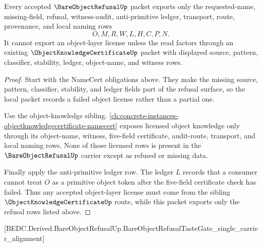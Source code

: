 \begin{theorem}
\label{thm:bare-object-refusal-object-license-nonescape}
Every accepted $\BareObjectRefusalUp$ packet exports only the requested-name, missing-field, refusal, witness-audit, anti-primitive ledger, transport, route, provenance, and local naming rows
$$
O,M,R,W,L,H,C,P,N.
$$
It cannot export an object-layer license unless the read factors through an existing $\ObjectKnowledgeCertificateUp$ packet with displayed source, pattern, classifier, stability, ledger, object-name, and witness rows.
\end{theorem}
\begin{proof}
Start with the NameCert obligations above. They make the missing source, pattern, classifier, stability, and ledger fields part of the refusal surface, so the local packet records a failed object license rather than a partial one.

Use the object-knowledge sibling. \autoref{ch:concrete-instances-objectknowledgecertificate-namecert} exposes licensed object knowledge only through its object-name, witness, five-field certificate, audit-route, transport, and local naming rows. None of those licensed rows is present in the $\BareObjectRefusalUp$ carrier except as refused or missing data.

Finally apply the anti-primitive ledger row. The ledger $L$ records that a consumer cannot treat $O$ as a primitive object token after the five-field certificate check has failed. Thus any accepted object-layer license must come from the sibling $\ObjectKnowledgeCertificateUp$ route, while this packet exports only the refusal rows listed above.
\end{proof}



[BEDC.Derived.BareObjectRefusalUp.BareObjectRefusalTasteGate\_single\_carrier\_alignment]

